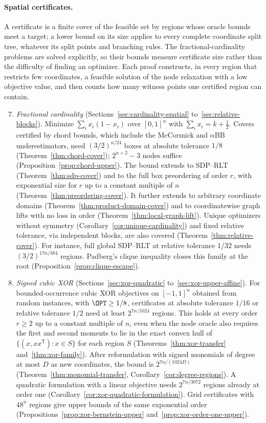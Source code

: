 \documentclass[11pt]{article}
\begin{document}
\paragraph{Spatial certificates.}
A certificate is a finite cover of the feasible set by regions whose oracle
bounds meet a target; a lower bound on its size applies to every complete
coordinate split tree, whatever its split points and branching rules. The fractional-cardinality problems are solved
explicitly, so their bounds measure certificate size rather than the
difficulty of finding an optimizer. Each proof constructs, in every region
that restricts few coordinates, a feasible solution of the node relaxation
with a low objective value, and then counts how many witness points one
certified region can contain.
\begin{enumerate}\setcounter{enumi}{6}
\item \emph{Fractional cardinality} (Sections~\ref{sec:cardinality-spatial}
to~\ref{sec:relative-blocks}). Minimize $\sum_ix_i(1-x_i)$ over
$[0,1]^n$ with $\sum_ix_i=k+\tfrac12$. Covers certified by chord bounds,
which include the McCormick and $\alpha$BB underestimators, need
$(3/2)^{n/24}$ boxes at absolute tolerance $1/8$
(Theorem~\ref{thm:chord-cover}); $2^{n+2}-3$ nodes suffice
(Proposition~\ref{prop:chord-upper}). The bound extends to SDP--RLT
(Theorem~\ref{thm:sdp-cover}) and to the full box preordering of order
$r$, with exponential size for $r$ up to a constant multiple of $n$
(Theorem~\ref{thm:preordering-cover}). It further extends to arbitrary coordinate domains
(Theorem~\ref{thm:product-domain-cover}) and to coordinatewise graph
lifts with no loss in order (Theorem~\ref{thm:local-graph-lift}). Unique
optimizers without symmetry (Corollary~\ref{cor:unique-cardinality}) and
fixed relative tolerance, via independent blocks, are also covered
(Theorem~\ref{thm:relative-cover}). For instance, full global SDP--RLT at
relative tolerance $1/32$ needs $(3/2)^{17n/384}$ regions. Padberg's
clique inequality closes this family at the root
(Proposition~\ref{prop:clique-escape}).
\item \emph{Signed cubic XOR} (Sections~\ref{sec:xor-quadratic}
to~\ref{sec:xor-upper-affine}). For bounded-occurrence cubic XOR
objectives on $[-1,1]^n$ obtained from random instances, with
$\OPT\ge1/8$, certificates at absolute tolerance $1/16$ or relative
tolerance $1/2$ need at least $2^{7n/1024}$ regions. This holds at every
order $r\ge2$ up to a constant multiple of $n$, even when the node oracle
also requires the first and second moments to lie in the exact convex hull
of $\{(x,xx^{\mathsf T}):x\in S\}$ for each region $S$
(Theorems~\ref{thm:xor-transfer} and~\ref{thm:xor-family}). After
reformulation with signed monomials of degree at most $D$ as new
coordinates, the bound is $2^{7n/(1024D)}$
(Theorem~\ref{thm:monomial-transfer}, Corollary~\ref{cor:degree-regions}).
A quadratic formulation with a linear objective needs $2^{7n/3072}$
regions already at order one
(Corollary~\ref{cor:xor-quadratic-formulation}). Grid certificates with
$48^n$ regions give upper bounds of the same exponential order
(Propositions~\ref{prop:xor-bernstein-upper}
and~\ref{prop:xor-order-one-upper}).
\end{enumerate}
\end{document}
